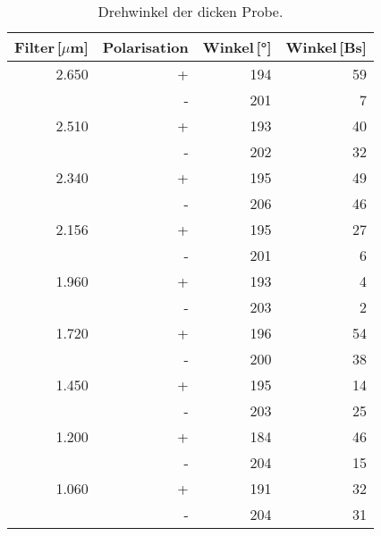 \begin{table}
	\centering
	\caption[]{Drehwinkel der dicken Probe.}
	\begin{tabular}{r r r r}
		Filter\,[$\mu$m] & Polarisation & Winkel\,[°] & Winkel\,[Bs]\\
		\hline\hline
		2.650	&	+	&	194	&	59\\
				&	-	&	201	&	 7\\
		2.510	&	+	&	193	&	40\\
				&	-	&	202	&	32\\
		2.340	&	+	&	195	&	49\\
				&	-	&	206	&	46\\
		2.156	&	+	&	195	&	27\\
				&	-	&	201	&	 6\\
		1.960	&	+	&	193	&	 4\\
				&	-	&	203	&	 2\\
		1.720	&	+	&	196	&	54\\
				&	-	&	200	&	38\\
		1.450	&	+	&	195	&	14\\
				&	-	&	203	&	25\\
		1.200	&	+	&	184	&	46\\
				&	-	&	204	&	15\\
		1.060	&	+	&	191	&	32\\
				&	-	&	204	&	31\\
		\hline
	\end{tabular}
	\label{tab_2}
\end{table}